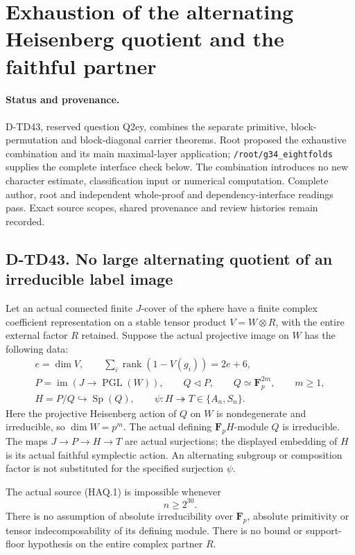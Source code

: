 \section{Exhaustion of the alternating Heisenberg quotient and the faithful partner}
\label{sec:heisenberg-alternating-quotient-exclusion}

\paragraph{Status and provenance.}
D-TD43, reserved question Q2ey, combines the separate primitive,
block-permutation and block-diagonal carrier theorems. Root proposed
the exhaustive combination and its main maximal-layer application;
\texttt{/root/g34\_eightfolds} supplies the complete interface check
below. The combination introduces no new character estimate,
classification input or numerical computation. Complete author, root and
independent whole-proof and dependency-interface readings pass. Exact
source scopes, shared provenance and review histories remain recorded.

\subsection*{D-TD43. No large alternating quotient of an irreducible label image}

Let an actual connected finite $J$-cover of the sphere have a finite
complex coefficient representation on a stable tensor product
$V=W\otimes R$, with the entire external factor $R$ retained. Suppose
the actual projective image on $W$ has the following data:
\[
 \begin{gathered}
 e=\dim V,\qquad
 \sum_i\operatorname{rank}(1-V(g_i))=2e+6,\\
 P=\operatorname{im}(J\to\operatorname{PGL}(W)),\qquad
 Q\triangleleft P,\qquad Q\simeq\mathbf F_p^{2m},\qquad m\ge1,\\
 H=P/Q\hookrightarrow\operatorname{Sp}(Q),\qquad
 \psi:H\twoheadrightarrow T\in\{A_n,S_n\}.
 \end{gathered}
 \tag{HAQ.1}
\]
Here the projective Heisenberg action of $Q$ on $W$ is nondegenerate
and irreducible, so $\dim W=p^m$. The actual defining
$\mathbf F_pH$-module $Q$ is irreducible. The maps $J\to P\to H\to T$
are actual surjections; the displayed embedding of $H$ is its actual
faithful symplectic action. An alternating subgroup or composition
factor is not substituted for the specified surjection $\psi$.

\begin{theorem}[D-TD43]
The actual source (HAQ.1) is impossible whenever
\[
                              n\ge2^{30}.
 \tag{HAQ.2}
\]
There is no assumption of absolute irreducibility over $\mathbf F_p$,
absolute primitivity or tensor indecomposability of its defining
module. There is no bound or support-floor hypothesis on the entire
complex partner $R$.
\end{theorem}

